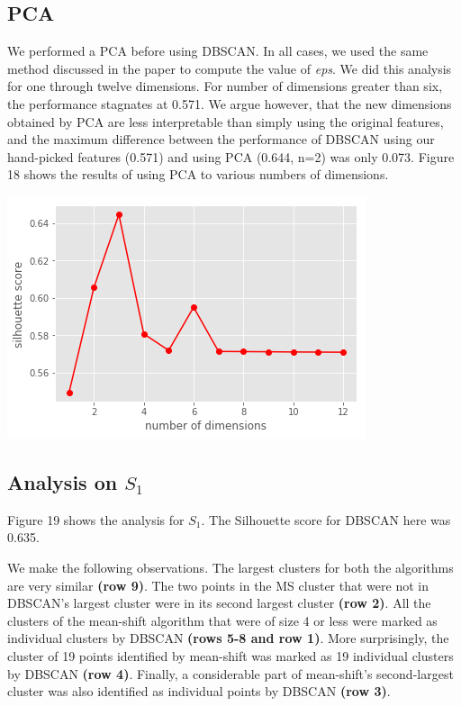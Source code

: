 \documentclass[12pt,a4paper]{article}
\begin{document}
\subsection{PCA}
We performed a PCA before using DBSCAN. In all cases, we used the same method discussed in the paper to compute the value of \textit{eps}. We did this analysis for one through twelve dimensions. For number of dimensions greater than six, the performance stagnates at 0.571. We argue however, that the new dimensions obtained by PCA are less interpretable than simply using the original features, and the maximum difference between the performance of DBSCAN using our hand-picked features (0.571) and using PCA (0.644, n=2) was only 0.073. Figure 18 shows the results of using PCA to various numbers of dimensions.

\includegraphics[scale=0.7]{pca.png}
\begingroup
{}
\endgroup

\subsection{Analysis on $S_1$}
Figure 19 shows the analysis for $S_1$. The Silhouette score for DBSCAN here was 0.635.

We make the following observations. The largest clusters for both the algorithms are very similar \textbf{(row 9)}. The two points in the MS cluster that were not in DBSCAN's largest cluster were in its second largest cluster \textbf{(row 2)}. All the clusters of the mean-shift algorithm that were of size 4 or less were marked as individual clusters by DBSCAN \textbf{(rows 5-8 and row 1)}. More surprisingly, the cluster of 19 points identified by mean-shift was marked as 19 individual clusters by DBSCAN \textbf{(row 4)}. Finally, a considerable part of mean-shift's second-largest cluster was also identified as individual points by DBSCAN \textbf{(row 3)}.
\end{document}

